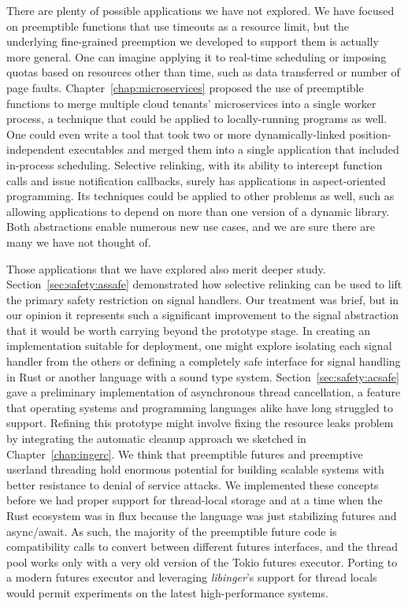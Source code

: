 There are plenty of possible applications we have not explored.  We have focused on
preemptible functions that use timeouts as a resource limit, but the underlying
fine-grained preemption we developed to support them is actually more general.  One
can imagine applying it to real-time scheduling or imposing quotas based on resources
other than time, such as data transferred or number of page faults.
Chapter~\ref{chap:microservices} proposed the use of preemptible functions to merge
multiple cloud tenants' microservices into a single worker process, a technique that
could be applied to locally-running programs as well.  One could even write a tool
that took two or more dynamically-linked position-independent executables and merged
them into a single application that included in-process scheduling.  Selective
relinking, with its ability to intercept function calls and issue notification
callbacks, surely has applications in aspect-oriented programming.  Its techniques
could be applied to other problems as well, such as allowing applications to depend
on more than one version of a dynamic library.  Both abstractions enable numerous new
use cases, and we are sure there are many we have not thought of.

Those applications that we have explored also merit deeper study.
Section~\ref{sec:safety:assafe} demonstrated how selective relinking can be used to
lift the primary safety restriction on signal handlers.  Our treatment was brief, but
in our opinion it represents such a significant improvement to the signal abstraction
that it would be worth carrying beyond the prototype stage.  In creating an
implementation suitable for deployment, one might explore isolating each signal
handler from the others or defining a completely safe interface for signal handling
in Rust or another language with a sound type system.
Section~\ref{sec:safety:acsafe} gave a preliminary implementation of asynchronous
thread cancellation, a feature that operating systems and programming languages alike
have long struggled to support.  Refining this prototype might involve fixing the
resource leaks problem by integrating the automatic cleanup approach we sketched in
Chapter~\ref{chap:ingerc}.
We think that preemptible futures and preemptive userland threading hold enormous
potential for building scalable systems with better resistance to denial of service
attacks.  We implemented these concepts before we had proper support for thread-local
storage and at a time when the Rust ecosystem was in flux because the language was
just stabilizing futures and async/await.  As such, the majority of the preemptible
future code is compatibility calls to convert between different futures interfaces,
and the thread pool works only with a very old version of the Tokio futures executor.
Porting to a modern futures executor and leveraging \textit{libinger}'s support for
thread locals would permit experiments on the latest high-performance systems.

